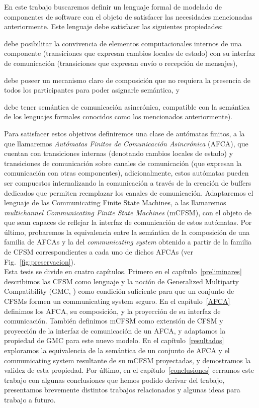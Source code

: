 En este trabajo buscaremos definir un lenguaje formal de modelado de componentes de software con el objeto de satisfacer las necesidades mencionadas anteriormente. Este lenguaje debe satisfacer las siguientes propiedades:
\begin{inparaenum}[1.]
\item debe posibilitar la convivencia de elementos computacionales internos de una componente (transiciones que expresan cambios locales de estado) con su interfaz de comunicación (transiciones que expresan envío o recepción de mensajes),
\item debe poseer un mecanismo claro de composición que no requiera la presencia de todos los participantes para poder asignarle semántica, y
\item debe tener semántica de comunicación asincrónica, compatible con la semántica de los lenguajes formales conocidos como los mencionados anteriormente).
\end{inparaenum}

Para satisfacer estos objetivos definiremos una clase de autómatas finitos, a la que llamaremos \emph{Autómatas Finitos de Comunicación Asincrónica} (AFCA), que cuentan con transiciones internas (denotando cambios locales de estado) y transiciones de comunicación sobre canales de comunicación (que expresan la comunicación con otras componentes), adicionalmente, estos autómatas pueden ser compuestos internalizando la comunicación a través de la creación de buffers dedicados que permiten reemplazar los canales de comunicación. Adaptaremos el lenguaje de las Communicating Finite State Machines, a las llamaremos \emph{multichannel Communicating Finite State Machines} (mCFSM), con el objeto de que sean capaces de reflejar la interfaz de comunicación de estos autómatas. Por último, probaremos la equivalencia entre la semántica de la composición de una familia de AFCAs y la del \emph{communicating system} obtenido a partir de la familia de CFSM correspondientes a cada uno de dichos AFCAs (ver Fig.~\ref{fig:preservacion}).\\


Esta tesis se divide en cuatro capítulos. Primero en el capítulo~\ref{preliminares} describimos las CFSM como lenguaje y la noción de Generalized Multiparty Compatibility (GMC, \cite{lange:popl15}) como condición suficiente para que un conjunto de CFSMs formen un communicating system seguro. En el capítulo~\ref{AFCA} definimos los AFCA, su composición, y la proyección de su interfaz de comunicación. También definimos mCFSM como extensión de CFSM y proyección de la interfaz de comunicación de un AFCA, y adaptamos la propiedad de GMC para este nuevo modelo. En el capítulo~\ref{resultados} exploramos la equivalencia de la semántica de un conjunto de AFCA y el communicating system resultante de su mCFSM proyectadas, y demostramos la validez de esta propiedad. Por último, en el capítulo~\ref{conclusiones} cerramos este trabajo con algunas conclusiones que hemos podido derivar del trabajo, presentamos brevemente distintos trabajos relacionados y algunas ideas para trabajo a futuro.



